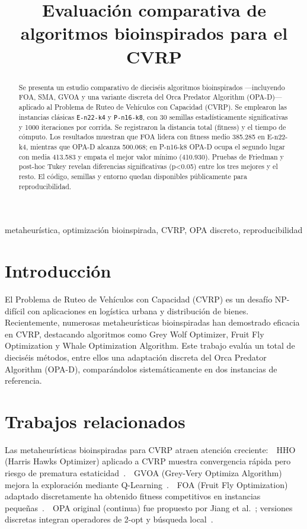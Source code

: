 \documentclass[conference]{IEEEtran}
\title{Evaluación comparativa de algoritmos bioinspirados para el CVRP}
\author{%
  \IEEEauthorblockN{Felipe Ignacio González González}
  \IEEEauthorblockA{Programa de Magíster en Informática\
                    Universidad de Valparaíso, Chile\
                    \href{mailto:felipe.gonzalez.g@gmail.com}{felipe.gonzalez.g@gmail.com}}
}
\begin{document}
\maketitle

\begin{abstract}
Se presenta un estudio comparativo de dieciséis algoritmos bioinspirados —incluyendo FOA, SMA, GVOA y una variante discreta del Orca Predator Algorithm (OPA-D)— aplicado al Problema de Ruteo de Vehículos con Capacidad (CVRP). Se emplearon las instancias clásicas \texttt{E-n22-k4} y \texttt{P-n16-k8}, con 30 semillas estadísticamente significativas y 1000 iteraciones por corrida. Se registraron la distancia total (fitness) y el tiempo de cómputo. Los resultados muestran que FOA lidera con fitness medio 385.285 en E-n22-k4, mientras que OPA-D alcanza 500.068; en P-n16-k8 OPA-D ocupa el segundo lugar con media 413.583 y empata el mejor valor mínimo (410.930). Pruebas de Friedman y post-hoc Tukey revelan diferencias significativas (p<0.05) entre los tres mejores y el resto. El código, semillas y entorno quedan disponibles públicamente para reproducibilidad.
\end{abstract}

\begin{IEEEkeywords}
metaheurística, optimización bioinspirada, CVRP, OPA discreto, reproducibilidad
\end{IEEEkeywords}

\section{Introducción}
El Problema de Ruteo de Vehículos con Capacidad (CVRP) es un desafío NP-difícil con aplicaciones en logística urbana y distribución de bienes. Recientemente, numerosas metaheurísticas bioinspiradas han demostrado eficacia en CVRP, destacando algoritmos como Grey Wolf Optimizer, Fruit Fly Optimization y Whale Optimization Algorithm. Este trabajo evalúa un total de dieciséis métodos, entre ellos una adaptación discreta del Orca Predator Algorithm (OPA-D), comparándolos sistemáticamente en dos instancias de referencia.

\section{Trabajos relacionados}
Las metaheurísticas bioinspiradas para CVRP atraen atención creciente:\
\textbullet\ HHO (Harris Hawks Optimizer) aplicado a CVRP muestra convergencia rápida pero riesgo de prematura estaticidad~\cite{Heidari2019HHO}.\
\textbullet\ GVOA (Grey-Very Optimiza Algorithm) mejora la exploración mediante Q-Learning~\cite{Hussein2023GVOA}.\
\textbullet\ FOA (Fruit Fly Optimization) adaptado discretamente ha obtenido fitness competitivos en instancias pequeñas~\cite{Mahi2018DFOA}.\
\textbullet\ OPA original (continua) fue propuesto por Jiang et al.~\cite{Jiang2021OPA}; versiones discretas integran operadores de 2-opt y búsqueda local~\cite{Kilinç2024DOPA}.
\end{document}
